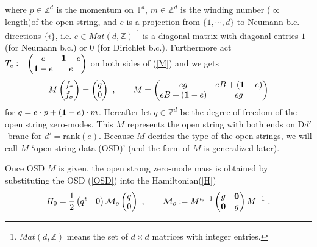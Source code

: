 \documentclass[a4paper,12pt]{article}
\newcommand{\Z}{{\mathbb{Z}}}
\newcommand{\T}{{\mathbb{T}}}
\newcommand{\bp}{\begin{pmatrix}}
\newcommand{\ep}{\end{pmatrix}}
\def \rank{\mathrm{rank}}
\def \ov#1{\frac{1}{#1}}
\def \cM{{\cal M}}
\def \0{{\bf 0}}
\def \1{{\bf 1}}
\def \Mat{\mathit{Mat}}
\begin{document}
where $p\in\Z^d$ is the momentum on $\T^d$, $m\in\Z^d$ is the winding number 
($\propto$ length)of the open string, 
and $e$ is a projection from $\{1,\cdots,d\}$ to Neumann b.c. directions 
$\{i\}$, i.e. $e\in \Mat(d,\Z)$
\footnote{$\Mat(d,\Z)$ means the set of $d\times d$ matrices with integer 
entries.}
 is a diagonal matrix with diagonal entries 
$1$ (for Neumann b.c.) or $0$ (for Dirichlet b.c.). 
Furthermore act 
\begin{math} T_e:=\bp e&\1-e\\ \1-e&e\ep\end{math}
on both sides of (\ref{M}) and we gets 
\begin{equation}
 M\bp f_\tau\\ f_\sigma \ep=\bp q \\ 0\ep\ ,\qquad 
 M=\bp eg & eB +(\1-e)\\ eB +(\1-e)&eg \ep \label{OSD}
\end{equation}
for $q=e\cdot p+(\1-e)\cdot m$. 
Hereafter let $q\in\Z^d$ be the degree of freedom of the open string 
zero-modes. This $M$ represents the open string with both ends 
on D$d'$-brane for $d'=\rank (e)$. 
Because $M$ decides the type of the open strings, 
we will call $M$ `open string data (OSD)' 
(and the form of $M$ is generalized later).   

Once OSD $M$ is given, the open strong zero-mode mass is obtained by 
substituting the OSD (\ref{OSD}) into the Hamiltonian(\ref{H}) 
\begin{equation}
 H_0=\ov{2}\bp q^t& 0\ep  \cM_o \bp q\\ 0 \ep  \ ,\qquad 
 \cM_o:=M^{t,-1} \bp g  & \0\\ \0 & g \ep M^{-1} \ . \label{HM}
\end{equation}
\end{document}
